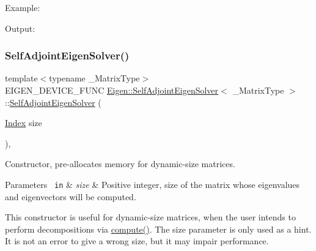 Example\+: 
\begin{DoxyCodeInclude}{0}
\end{DoxyCodeInclude}
 Output\+: 
\begin{DoxyVerbInclude}
\end{DoxyVerbInclude}
 \mbox{\label{class_eigen_1_1_self_adjoint_eigen_solver_af20f466a4c29477271e91841e3382b27}} 
\subsubsection{\texorpdfstring{SelfAdjointEigenSolver()}{SelfAdjointEigenSolver()}\hspace{0.1cm}{\footnotesize\ttfamily [2/3]}}
{\footnotesize\ttfamily template$<$typename \+\_\+\+Matrix\+Type$>$ \\
E\+I\+G\+E\+N\+\_\+\+D\+E\+V\+I\+C\+E\+\_\+\+F\+U\+NC \mbox{\hyperlink{class_eigen_1_1_self_adjoint_eigen_solver}{Eigen\+::\+Self\+Adjoint\+Eigen\+Solver}}$<$ \+\_\+\+Matrix\+Type $>$\+::\mbox{\hyperlink{class_eigen_1_1_self_adjoint_eigen_solver}{Self\+Adjoint\+Eigen\+Solver}} (\begin{DoxyParamCaption}\item[{\mbox{\hyperlink{class_eigen_1_1_self_adjoint_eigen_solver_a8a59ab7734b6eae2754fd78bc7c3a360}{Index}}}]{size }\end{DoxyParamCaption})\hspace{0.3cm}{\ttfamily [inline]}, {\ttfamily [explicit]}}



Constructor, pre-\/allocates memory for dynamic-\/size matrices. 


\begin{DoxyParams}[1]{Parameters}
\mbox{\texttt{ in}}  & {\em size} & Positive integer, size of the matrix whose eigenvalues and eigenvectors will be computed.\\
\hline
\end{DoxyParams}
This constructor is useful for dynamic-\/size matrices, when the user intends to perform decompositions via \mbox{\hyperlink{class_eigen_1_1_self_adjoint_eigen_solver_a88bcdc24112efa7c4d2ebb3476efcbe9}{compute()}}. The {\ttfamily size} parameter is only used as a hint. It is not an error to give a wrong {\ttfamily size}, but it may impair performance.

